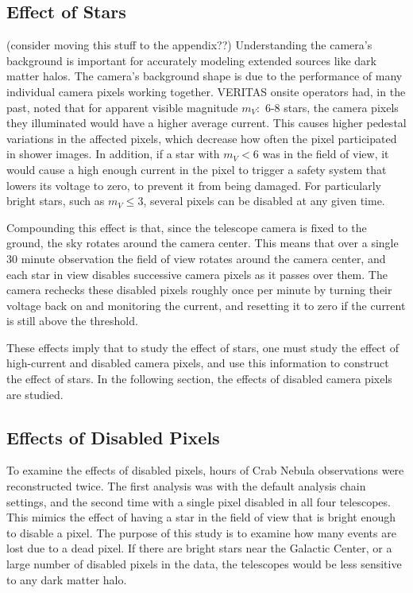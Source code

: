   \subsection{Effect of Stars}
    {\color{red}(consider moving this stuff to the appendix??)}
    Understanding the camera's background is important for accurately modeling extended sources like dark matter halos.
    The camera's background shape is due to the performance of many individual camera pixels working together.
    VERITAS onsite operators had, in the past, noted that for apparent visible magnitude $m_V :$ 6-8 stars, the camera pixels they illuminated would have a higher average current.
    This causes higher pedestal variations in the affected pixels, which decrease how often the pixel participated in shower images.
    In addition, if a star with $m_V < 6$ was in the field of view, it would cause a high enough current in the pixel to trigger a safety system that lowers its voltage to zero, to prevent it from being damaged.
    For particularly bright stars, such as $m_V \leq 3$, several pixels can be disabled at any given time.

    Compounding this effect is that, since the telescope camera is fixed to the ground, the sky rotates around the camera center.
    This means that over a single 30 minute observation the field of view rotates around the camera center, and each star in view disables successive camera pixels as it passes over them.
    The camera rechecks these disabled pixels roughly once per minute by turning their voltage back on and monitoring the current, and resetting it to zero if the current is still above the threshold.

    These effects imply that to study the effect of stars, one must study the effect of high-current and disabled camera pixels, and use this information to construct the effect of stars.
    In the following section, the effects of disabled camera pixels are studied.
    
  \subsection{Effects of Disabled Pixels}

    To examine the effects of disabled pixels,  hours of Crab Nebula observations were reconstructed twice.
    The first analysis was with the default analysis chain settings, and the second time with a single pixel disabled in all four telescopes.
    This mimics the effect of having a star in the field of view that is bright enough to disable a pixel.
    The purpose of this study is to examine how many events are lost due to a dead pixel.
    If there are bright stars near the Galactic Center, or a large number of disabled pixels in the data, the telescopes would be less sensitive to any dark matter halo.

